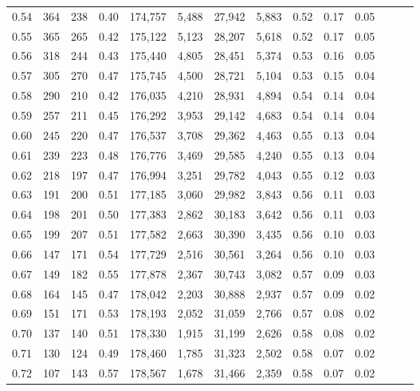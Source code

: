 \begin{tabular}{rrrrrrrrrrrrrr}
0.54 &    364 &  238 &  0.40 &  174,757 &    5,488 &  27,942 &   5,883 &  0.52 &  0.17 &      0.05 \\
0.55 &    365 &  265 &  0.42 &  175,122 &    5,123 &  28,207 &   5,618 &  0.52 &  0.17 &      0.05 \\
0.56 &    318 &  244 &  0.43 &  175,440 &    4,805 &  28,451 &   5,374 &  0.53 &  0.16 &      0.05 \\
0.57 &    305 &  270 &  0.47 &  175,745 &    4,500 &  28,721 &   5,104 &  0.53 &  0.15 &      0.04 \\
0.58 &    290 &  210 &  0.42 &  176,035 &    4,210 &  28,931 &   4,894 &  0.54 &  0.14 &      0.04 \\
0.59 &    257 &  211 &  0.45 &  176,292 &    3,953 &  29,142 &   4,683 &  0.54 &  0.14 &      0.04 \\
0.60 &    245 &  220 &  0.47 &  176,537 &    3,708 &  29,362 &   4,463 &  0.55 &  0.13 &      0.04 \\
0.61 &    239 &  223 &  0.48 &  176,776 &    3,469 &  29,585 &   4,240 &  0.55 &  0.13 &      0.04 \\
0.62 &    218 &  197 &  0.47 &  176,994 &    3,251 &  29,782 &   4,043 &  0.55 &  0.12 &      0.03 \\
0.63 &    191 &  200 &  0.51 &  177,185 &    3,060 &  29,982 &   3,843 &  0.56 &  0.11 &      0.03 \\
0.64 &    198 &  201 &  0.50 &  177,383 &    2,862 &  30,183 &   3,642 &  0.56 &  0.11 &      0.03 \\
0.65 &    199 &  207 &  0.51 &  177,582 &    2,663 &  30,390 &   3,435 &  0.56 &  0.10 &      0.03 \\
0.66 &    147 &  171 &  0.54 &  177,729 &    2,516 &  30,561 &   3,264 &  0.56 &  0.10 &      0.03 \\
0.67 &    149 &  182 &  0.55 &  177,878 &    2,367 &  30,743 &   3,082 &  0.57 &  0.09 &      0.03 \\
0.68 &    164 &  145 &  0.47 &  178,042 &    2,203 &  30,888 &   2,937 &  0.57 &  0.09 &      0.02 \\
0.69 &    151 &  171 &  0.53 &  178,193 &    2,052 &  31,059 &   2,766 &  0.57 &  0.08 &      0.02 \\
0.70 &    137 &  140 &  0.51 &  178,330 &    1,915 &  31,199 &   2,626 &  0.58 &  0.08 &      0.02 \\
0.71 &    130 &  124 &  0.49 &  178,460 &    1,785 &  31,323 &   2,502 &  0.58 &  0.07 &      0.02 \\
0.72 &    107 &  143 &  0.57 &  178,567 &    1,678 &  31,466 &   2,359 &  0.58 &  0.07 &      0.02 \\

\end{tabular}
